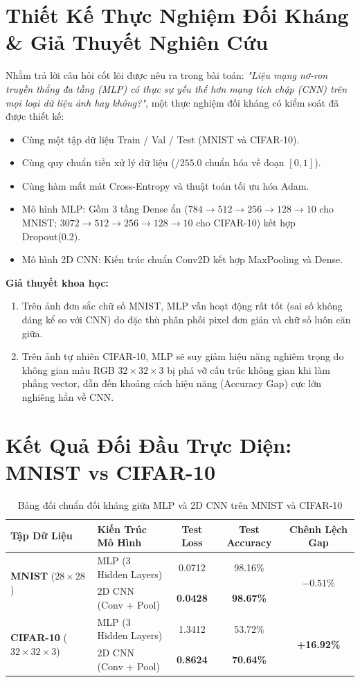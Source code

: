 \documentclass[12pt,a4paper]{report}
\begin{document}
\section{Thiết Kế Thực Nghiệm Đối Kháng \& Giả Thuyết Nghiên Cứu}
Nhằm trả lời câu hỏi cốt lõi được nêu ra trong bài toán: \textit{"Liệu mạng nơ-ron truyền thẳng đa tầng (MLP) có thực sự yếu thế hơn mạng tích chập (CNN) trên mọi loại dữ liệu ảnh hay không?"}, một thực nghiệm đối kháng có kiểm soát đã được thiết kế:
\begin{itemize}
    \item Cùng một tập dữ liệu Train / Val / Test (MNIST và CIFAR-10).
    \item Cùng quy chuẩn tiền xử lý dữ liệu ($/ 255.0$ chuẩn hóa về đoạn $[0, 1]$).
    \item Cùng hàm mất mát Cross-Entropy và thuật toán tối ưu hóa Adam.
    \item Mô hình MLP: Gồm 3 tầng Dense ẩn ($784 \to 512 \to 256 \to 128 \to 10$ cho MNIST; $3072 \to 512 \to 256 \to 128 \to 10$ cho CIFAR-10) kết hợp Dropout(0.2).
    \item Mô hình 2D CNN: Kiến trúc chuẩn Conv2D kết hợp MaxPooling và Dense.
\end{itemize}

\textbf{Giả thuyết khoa học:}
\begin{enumerate}
    \item Trên ảnh đơn sắc chữ số MNIST, MLP vẫn hoạt động rất tốt (sai số không đáng kể so với CNN) do đặc thù phân phối pixel đơn giản và chữ số luôn căn giữa.
    \item Trên ảnh tự nhiên CIFAR-10, MLP sẽ suy giảm hiệu năng nghiêm trọng do không gian màu RGB $32 \times 32 \times 3$ bị phá vỡ cấu trúc không gian khi làm phẳng vector, dẫn đến khoảng cách hiệu năng (Accuracy Gap) cực lớn nghiêng hẳn về CNN.
\end{enumerate}

\section{Kết Quả Đối Đầu Trực Diện: MNIST vs CIFAR-10}
\begin{table}[H]
\centering
\small
\caption{Bảng đối chuẩn đối kháng giữa MLP và 2D CNN trên MNIST và CIFAR-10}
\label{tab:mlp_vs_cnn_comparison}
\begin{tabularx}{\textwidth}{l X ccc}
\toprule
\textbf{Tập Dữ Liệu} & \textbf{Kiến Trúc Mô Hình} & \textbf{Test Loss} & \textbf{Test Accuracy} & \textbf{Chênh Lệch Gap} \\
\midrule
\multirow{2}{*}{\textbf{MNIST} ($28 \times 28$)} & MLP (3 Hidden Layers) & 0.0712 & 98.16\% & \multirow{2}{*}{$-0.51\%$} \\
& 2D CNN (Conv + Pool) & \textbf{0.0428} & \textbf{98.67\%} & \\
\midrule
\multirow{2}{*}{\textbf{CIFAR-10} ($32 \times 32 \times 3$)} & MLP (3 Hidden Layers) & 1.3412 & 53.72\% & \multirow{2}{*}{\textbf{+16.92\%}} \\
& 2D CNN (Conv + Pool) & \textbf{0.8624} & \textbf{70.64\%} & \\
\bottomrule
\end{tabularx}
\end{table}
\end{document}
